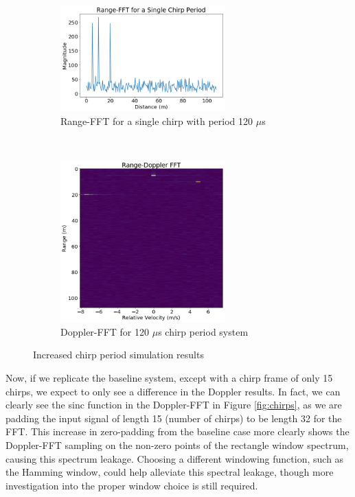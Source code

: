\begin{figure}[h]
	\centering 
	\begin{subfigure}[c]{0.5\textwidth}
		\centering
		\includegraphics[width=2.5in]{imgs/long_period_range}
		\caption{Range-FFT for a single chirp with period 120 $\mu$s}
	\end{subfigure}%
	~
	\begin{subfigure}[c]{0.5\textwidth}
		\centering
		\includegraphics[width=2.5in]{imgs/long_period_doppler}
		\caption{Doppler-FFT for 120 $\mu$s chirp period 
		system}
	\end{subfigure}
	\caption{Increased chirp period simulation results}
	\label{fig:period}
\end{figure}

Now, if we replicate the baseline system, except with a chirp frame of only 15
chirps, we expect to only see a difference in the Doppler results. In fact, we
can clearly see the sinc function in the Doppler-FFT in Figure \ref{fig:chirps}, as we
are padding the input signal of length 15 (number of chirps) to be length 32 for
the FFT. This increase in zero-padding from the baseline case more clearly shows
the Doppler-FFT sampling on the non-zero points of the rectangle window
spectrum, causing this spectrum leakage. Choosing a different windowing
function, such as the Hamming window, could help alleviate this spectral leakage,
though more investigation into the proper window choice is still required.

